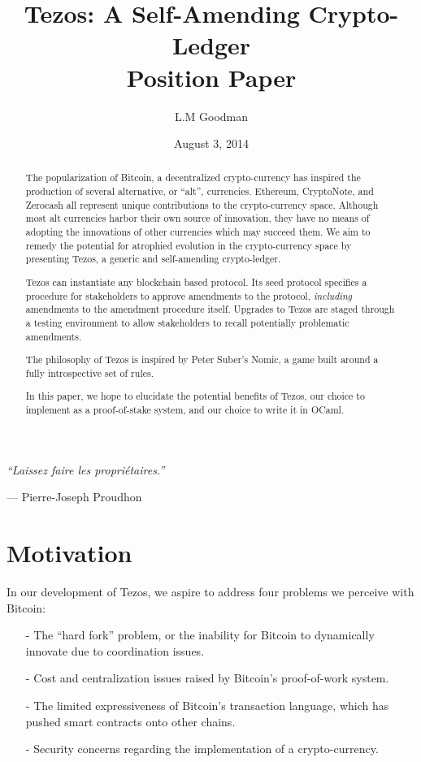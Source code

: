 \documentclass[letterpaper]{article}
\author{L.M Goodman}
\date{August 3, 2014}
\title{Tezos: A Self-Amending Crypto-Ledger \\ Position Paper}
\begin{document}
\maketitle



\epigraph{\emph{``Laissez faire les propri\'{e}taires.''}}
{--- \textup{Pierre-Joseph Proudhon}}

\begin{abstract}
The popularization of Bitcoin, a decentralized crypto-currency has inspired the
production of several alternative, or ``alt'', currencies. Ethereum, CryptoNote,
and Zerocash all represent unique contributions to the crypto-currency space. 
Although most alt currencies harbor their own source of innovation, they have
no means of adopting the innovations of other currencies which may succeed them.
We aim to remedy the potential for atrophied evolution in the crypto-currency 
space by presenting Tezos, a generic and self-amending crypto-ledger.

Tezos can instantiate any blockchain based protocol. Its seed protocol specifies
a procedure for stakeholders to approve amendments to the protocol,
\emph{including} amendments to the amendment procedure itself.
Upgrades to Tezos are staged through a testing environment to allow
stakeholders to recall potentially problematic amendments.

The philosophy of Tezos is inspired by Peter Suber's Nomic\cite{Nomic},
a game built around a fully introspective set of rules.

In this paper, we hope to elucidate the potential benefits of Tezos,
our choice to implement as a proof-of-stake system, and our choice to write it
in OCaml.

\end{abstract}
\newpage
\tableofcontents

\section{Motivation}
In our development of Tezos, we aspire to address four problems we perceive with
Bitcoin\cite{Bitcoin}:
\begin{itemize}
\item[-] The ``hard fork'' problem, or the inability for Bitcoin to dynamically
innovate due to coordination issues.
\item[-] Cost and centralization issues raised by Bitcoin's proof-of-work 
system.
\item[-] The limited expressiveness of Bitcoin's transaction language, which has
pushed smart contracts onto other chains.
\item[-] Security concerns regarding the implementation of a crypto-currency.
\end{itemize}
\end{document}
